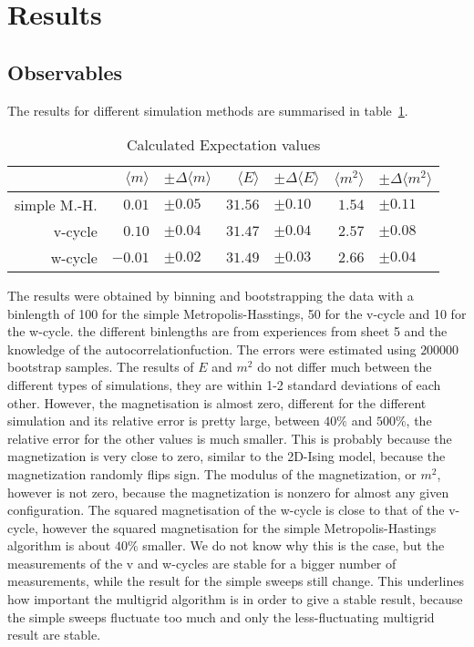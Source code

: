 \documentclass{scrartcl}
\begin{document}
\section{Results}
 

\subsection{Observables}

The results for different simulation methods are summarised in table~\ref{tab:results}.

\begin{table}[htbp]
	\begin{center}
	\begin{tabular}{r|rl|rl|rl}
& $\langle m \rangle$ & $\pm\Delta\langle m \rangle$ & $\langle E \rangle$ & $\pm\Delta \langle E \rangle$ & $\langle m^2 \rangle$ & $\pm\Delta \langle m^2 \rangle$ \\
\hline
simple M.-H. &              $0.01$ & $\pm0.05$                     &             $31.56$ & $\pm0.10$                    &                $1.54$ & $\pm0.11$                       \\
v-cycle &              $0.10$ & $\pm0.04$                     &             $31.47$ & $\pm0.04$                    &                $2.57$ & $\pm0.08$                       \\
w-cycle &             $-0.01$ & $\pm0.02$                     &             $31.49$ & $\pm0.03$                    &                $2.66$ & $\pm0.04$
	\end{tabular}
	\end{center}
	\caption{Calculated Expectation values}
	\label{tab:results}
\end{table}

The results were obtained by binning and bootstrapping the data with a binlength of 100 for the simple Metropolis-Hasstings, 50 for the v-cycle and 10 for the w-cycle. the different binlengths are from experiences from sheet 5 and the knowledge of the autocorrelationfuction. The errors were estimated using $200000$ bootstrap samples. The results of $E$ and $m^2$ do not differ much between the different types of simulations, they are within 1-2 standard deviations of each other. However, the magnetisation is almost zero, different for the different simulation and its relative error is pretty large, between $40\%$ and $500\%$, the relative error for the other values is much smaller. This is probably because the magnetization is very close to zero, similar to the 2D-Ising model, because the magnetization randomly flips sign. The modulus of the magnetization, or $m^2$, however is not zero, because the magnetization is nonzero for almost any given configuration. The squared magnetisation of the w-cycle is close to that of the v-cycle, however the squared magnetisation for the simple Metropolis-Hastings algorithm is about $40\%$ smaller. We do not know why this is the case, but the measurements of the v and w-cycles are stable for a bigger number of measurements, while the result for the simple sweeps still change. This underlines how important the multigrid algorithm is in order to give a stable result, because the simple sweeps fluctuate too much and only the less-fluctuating multigrid result are stable.
\end{document}
